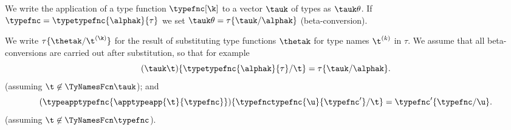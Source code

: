 
We write the application of a type function $\typefnc[\k]$ to a vector
$\tauk$ of types as $\tauk\theta$.
If $\typefnc=\typetypefnc{\alphak}{\tau}$ we set $\tauk\theta=\tau\{\tauk/\alphak\}$
(beta-conversion). 

We write $\tau\{\thetak/\t^{(\k)}\}$ for the result of substituting type
functions $\thetak$ for type names $\t^{(k)}$ in $\tau$.
We assume that all beta-conversions
are carried out after substitution, so that for example
\[(\tauk\t)\{\typetypefnc{\alphak}{\tau}/\t\}=\tau\{\tauk/\alphak\}.\]
(assuming $\t \not \in \TyNamesFcn \tauk$); and
\[(\typeapptypefnc{\apptypeapp{\t}{\typefnc}})\{\typefnctypefnc{\u}{\typefnc'}/\t\}=
     \typefnc'\{\typefnc/\u\}.\]
(assuming $\t \not \in \TyNamesFcn \typefnc$).
